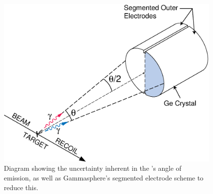 \begin{figure}
	\centerline{\includegraphics[height=0.3\textheight]{./img/c3/split_contact.eps}}
	\caption{Diagram showing the uncertainty inherent in the \gr{}'s angle of emission, as well as Gammasphere's segmented electrode scheme to reduce this.}
	\label{fig:chp3-doppler-split-contact}
\end{figure}

